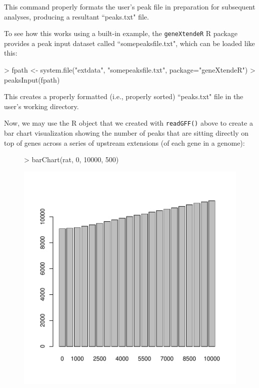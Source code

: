 \documentclass[12pt]{article}
\begin{document}
This command properly formats the user's peak file in preparation for subsequent analyses, producing a resultant ``peaks.txt" file.

To see how this works using a built-in example, the \texttt{geneXtendeR} R package provides a peak input dataset called ``somepeaksfile.txt", which can be loaded like this:

\begin{Schunk}
\begin{Sinput}
> fpath <- system.file("extdata", "somepeaksfile.txt", package="geneXtendeR")
> peaksInput(fpath)
\end{Sinput}
\end{Schunk}

This creates a properly formatted (i.e., properly sorted) ``peaks.txt" file in the user's working directory.

Now, we may use the R object that we created with \texttt{readGFF()} above to create a bar chart visualization showing the number of peaks that are sitting directly on top of genes across a series of upstream extensions (of each gene in a genome):

\begin{figure}[H]
\begin{center}
\begin{Schunk}
\begin{Sinput}
> barChart(rat, 0, 10000, 500)
\end{Sinput}
\end{Schunk}
\includegraphics{geneXtendeR-006}
\end{center}
\end{figure}
\end{document}
